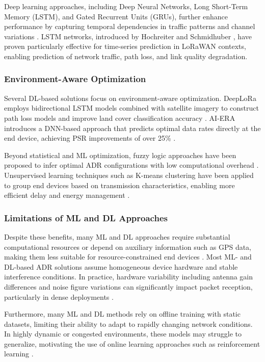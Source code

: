 \documentclass[12pt,a4paper]{article}
\begin{document}
Deep learning approaches, including Deep Neural Networks, Long Short-Term Memory (LSTM), and Gated Recurrent Units (GRUs), further enhance performance by capturing temporal dependencies in traffic patterns and channel variations \cite{Finnegan2020adr}. LSTM networks, introduced by Hochreiter and Schmidhuber \cite{Hochreiter97}, have proven particularly effective for time-series prediction in LoRaWAN contexts, enabling prediction of network traffic, path loss, and link quality degradation.

\subsubsection{Environment-Aware Optimization}

Several DL-based solutions focus on environment-aware optimization. DeepLoRa employs bidirectional LSTM models combined with satellite imagery to construct path loss models and improve land cover classification accuracy \cite{lui2021DeepLora}. AI-ERA introduces a DNN-based approach that predicts optimal data rates directly at the end device, achieving PSR improvements of over 25\% \cite{FarhadPyun2023}.

Beyond statistical and ML optimization, fuzzy logic approaches have been proposed to infer optimal ADR configurations with low computational overhead \cite{Kufakunesu2022}. Unsupervised learning techniques such as K-means clustering have been applied to group end devices based on transmission characteristics, enabling more efficient delay and energy management \cite{Farhad23-LoRaWAN-Meets-ML, Cuomo2018towards}.

\subsubsection{Limitations of ML and DL Approaches}

Despite these benefits, many ML and DL approaches require substantial computational resources or depend on auxiliary information such as GPS data, making them less suitable for resource-constrained end devices \cite{Zholamanov2024, Farhad23-LoRaWAN-Meets-ML, Farhad2022}. Most ML- and DL-based ADR solutions assume homogeneous device hardware and stable interference conditions. In practice, hardware variability including antenna gain differences and noise figure variations can significantly impact packet reception, particularly in dense deployments \cite{Zholamanov2024}.

Furthermore, many ML and DL methods rely on offline training with static datasets, limiting their ability to adapt to rapidly changing network conditions. In highly dynamic or congested environments, these models may struggle to generalize, motivating the use of online learning approaches such as reinforcement learning \cite{Farhad23-LoRaWAN-Meets-ML}.
\end{document}
